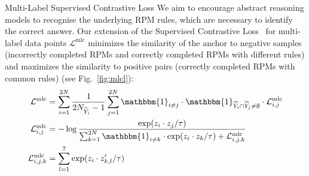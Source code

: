 \documentclass[final]{beamer}
\newlength{\colwidth}
\begin{document}
\begin{frame}[t]
\begin{columns}[t]
\begin{column}{\colwidth}
                \begin{block}{Multi-Label Supervised Contrastive Loss}
                    We aim to encourage abstract reasoning models to recognise the underlying RPM rules, which are necessary to identify the correct answer.
                    Our extension of the Supervised Contrastive Loss~\cite{khosla2020supervised} for multi-label data points $\mathcal{L}^{\text{mlc}}$ minimizes the similarity of the anchor to negative samples (incorrectly completed RPMs and correctly completed RPMs with different rules) and maximizes the similarity to positive pairs (correctly completed RPMs with common rules) (see Fig.~\ref{fig:mlcl}):
                    \begin{align*}
                        \mathcal{L}^{\text{mlc}} &= \sum_{i=1}^{2N} \frac{1}{2N_{\widetilde{Y}_i} - 1} \sum_{j=1}^{2N} \mathbbm{1}_{i \neq j} \cdot \mathbbm{1}_{\widetilde{Y}_i \cap \widetilde{Y}_j \neq \emptyset} \cdot \mathcal{L}_{i,j}^{\text{mlc}}\\
                        \mathcal{L}_{i,j}^{\text{mlc}} &= - \log\frac{\exp(z_i \cdot z_j / \tau)}{\sum_{k=1}^{2N} \mathbbm{1}_{i \neq k} \cdot \exp(z_i \cdot z_k / \tau) + \mathcal{L}_{i,j,k}^{\text{mlc}}}\\
                        \mathcal{L}_{i,j,k}^{\text{mlc}} &= \sum^7_{l=1} \exp(z_i \cdot z'_{k,l} / \tau)
                    \end{align*}
                \end{block}


\end{column}
\end{columns}
\end{frame}
\end{document}
